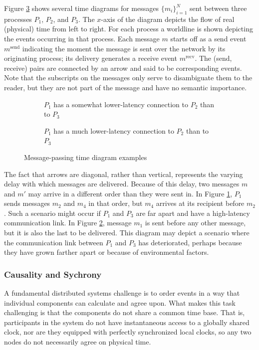 \documentclass[]             %
{NASA}                       %
\theoremstyle{definition}
\begin{document}
Figure \ref{fig:message-latencies} shows several time diagrams for
messages $\{m_i\}_{i=1}^N$ sent between three processes $P_1$, $P_2$,
and $P_3$. The $x$-axis of the diagram depicts the flow of real
(physical) time from left to right. For each process a worldline is
shown depicting the events occurring in that process. Each message $m$
starts off as a send event $m^\textrm{send}$ indicating the moment the
message is sent over the network by its originating process; its
delivery generates a receive event $m^\textrm{recv}$. The (send,
receive) pairs are connected by an arrow and said to be corresponding
events. Note that the subscripts on the messages only serve to
disambiguate them to the reader, but they are not part of the message
and have no semantic importance.

\begin{figure}[p]
  \setlength\belowcaptionskip{5ex}
  \begin{subfigure}{1\textwidth}
    \centering
    
    \caption{$P_1$ has a somewhat lower-latency connection to $P_2$ than to $P_3$}
    \label{fig:message-latencies-a}
  \end{subfigure}
  \begin{subfigure}{1\textwidth}
    \centering 
    \caption{$P_1$ has a much lower-latency connection to $P_2$ than to $P_3$}
    \label{fig:message-latencies-b}
  \end{subfigure}
  \caption{Message-passing time diagram examples}
  \label{fig:message-latencies}
\end{figure}

\afterpage{\clearpage}

The fact that arrows are diagonal, rather than vertical, represents
the varying delay with which messages are delivered. Because of this
delay, two messages $m$ and $m'$ may arrive in a different order than
they were sent in. In Figure \ref{fig:message-latencies-a}, $P_1$
sends messages $m_2$ and $m_4$ in that order, but $m_4$ arrives at its
recipient before $m_2$. Such a scenario might occur if $P_1$ and $P_3$
are far apart and have a high-latency communication link. In Figure
\ref{fig:message-latencies-b}, message $m_1$ is sent before any other
message, but it is also the last to be delivered. This diagram may
depict a scenario where the communication link between $P_1$ and $P_3$
has deteriorated, perhaps because they have grown farther apart or
because of environmental factors.

\subsubsection{Causality and  Sychrony}
A fundamental distributed systems challenge is to order events in a
way that individual components can calculate and agree upon. What
makes this task challenging is that the components do not share a
common time base. That is, participants in the system do not have
instantaneous access to a globally shared clock, nor are they equipped
with perfectly synchronized local clocks, so any two nodes do not
necessarily agree on physical time.
\end{document}
